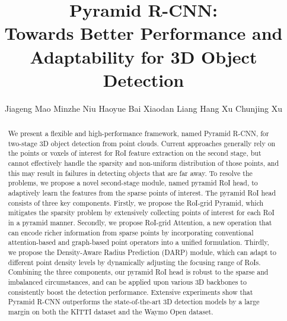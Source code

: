 \documentclass[10pt,twocolumn,letterpaper]{article}
\begin{document}
\title{Pyramid R-CNN:\\ Towards Better Performance and Adaptability for 3D Object Detection}

\author{Jiageng Mao 
\hspace{2mm}
Minzhe Niu 
\hspace{2mm}
Haoyue Bai 
\hspace{2mm}
Xiaodan Liang 
\hspace{2mm}
Hang Xu 
\hspace{2mm}
Chunjing Xu 
}

\maketitle
\ificcvfinal\thispagestyle{empty}\fi

\begin{abstract}
We present a flexible and high-performance framework, named Pyramid R-CNN, for two-stage 3D object detection from point clouds. Current approaches generally rely on the points or voxels of interest for RoI feature extraction on the second stage, but cannot effectively handle the sparsity and non-uniform distribution of those points, and this may result in failures in detecting objects that are far away. To resolve the problems, we propose a novel second-stage module, named pyramid RoI head, to adaptively learn the features from the sparse points of interest. The pyramid RoI head consists of three key components. Firstly, we propose the RoI-grid Pyramid, which mitigates the sparsity problem by extensively collecting points of interest for each RoI in a pyramid manner. Secondly, we propose RoI-grid Attention, a new operation that can encode richer information from sparse points by incorporating conventional attention-based and graph-based point operators into a unified formulation. Thirdly, we propose the Density-Aware Radius Prediction (DARP) module, which can adapt to different point density levels by dynamically adjusting the focusing range of RoIs. Combining the three components, our pyramid RoI head is robust to the sparse and imbalanced circumstances, and can be applied upon various 3D backbones to consistently boost the detection performance. Extensive experiments show that Pyramid R-CNN outperforms the state-of-the-art 3D detection models by a large margin on both the KITTI dataset and the Waymo Open dataset.
\end{abstract}

\let\thefootnote\relax{}
\end{document}
